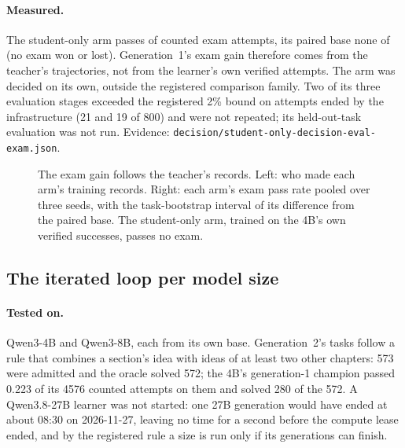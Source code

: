 \paragraph{Measured.} The student-only arm passes \StudentOnlyPasses{} of \StudentOnlyAttempts{} counted exam attempts, its
paired base none of \StudentOnlyBaseAttempts{} (no exam won or lost). Generation~1's exam gain therefore comes from the
teacher's trajectories, not from the learner's own verified attempts. The arm was decided on its own, outside the registered
comparison family. Two of its three evaluation stages exceeded the registered 2\% bound on attempts ended by the
infrastructure (21 and 19 of 800) and were not repeated; its held-out-task evaluation was not run. Evidence:
\nolinkurl{decision/student-only-decision-eval-exam.json}.

\begin{figure}[htbp]
\centering

\caption{The exam gain follows the teacher's records. Left: who made each arm's training records. Right: each arm's exam pass
rate pooled over three seeds, with the task-bootstrap interval of its difference from the paired base. The student-only arm,
trained on the 4B's own verified successes, passes no exam.}\label{fig:records}
\end{figure}

\subsection{The iterated loop per model size}\label{sec:r-loop}

\paragraph{Tested on.} Qwen3-4B and Qwen3-8B, each from its own base. Generation~2's tasks follow a rule that combines a
section's idea with ideas of at least two other chapters: 573 were admitted and the oracle solved 572; the 4B's generation-1
champion passed 0.223 of its 4576 counted attempts on them and solved 280 of the 572. A Qwen3.8-27B learner was not started: one 27B
generation would have ended at about 08:30 on 2026-11-27, leaving no time for a second before the compute lease ended, and by
the registered rule a size is run only if its generations can finish.


